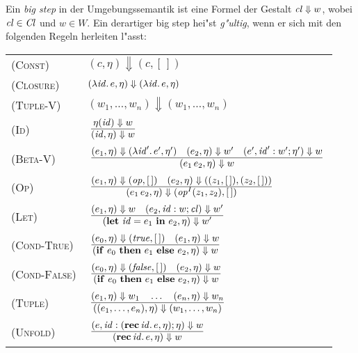 \documentclass[12pt,fleqn,a4paper]{article}
\newcommand{\RN}[1]{\mbox{\textsc{(#1)}}}
\newcommand{\Cl}{\name{Cl}}
\newcommand{\cl}{\name{cl}}
\begin{document}
\begin{definition}
Ein {\em big step} in der Umgebungssemantik ist eine Formel der Gestalt $\cl \Downarrow w$,
wobei $\cl\in\Cl$ und $w \in W$. Ein derartiger big step hei"st {\em g"ultig}, wenn er sich mit den
folgenden Regeln herleiten l"asst: \\[5mm]
\begin{tabular}{ll}
  \RN{Const}      & $(c,\eta) \Downarrow (c,[\,])$ \\[1mm]
  \RN{Closure}    & $(\lambda {\text{\it id\/}}.\,e,\eta) \Downarrow (\lambda {\text{\it id\/}}.\,e,\eta)$ \\[1mm]
  \RN{Tuple-V}    & $(w_1,\ldots,w_n) \Downarrow (w_1,\ldots,w_n)$ \\[1mm]
  \RN{Id}         & $\regel{\eta(\id) \Downarrow w}
                           {(\id,\eta) \Downarrow w}$ \\[3mm]
  \RN{Beta-V}     & $\regel{(e_1,\eta) \Downarrow (\abstr{\id'}{e'},\eta')
                            \quad (e_2,\eta) \Downarrow w'
                            \quad (e',\id':w';\eta') \Downarrow w}
                           {(\app{e_1}{e_2},\eta) \Downarrow w}$ \\[3mm]
  \RN{Op}         & $\regel{(e_1,\eta) \Downarrow (\op,[\,]) \quad (e_2,\eta) \Downarrow ((z_1,[\,]),(z_2,[\,]))}
                           {(\app{e_1}{e_2},\eta) \Downarrow (\op^I(z_1,z_2),[\,])}$ \\[3mm]
  \RN{Let}        & $\regel{(e_1,\eta) \Downarrow w \quad (e_2,\id:w;\cl) \Downarrow w'}
                           {(\bli{\id}{e_1}{e_2},\eta) \Downarrow w'}$ \\[3mm]
  \RN{Cond-True}  & $\regel{(e_0,\eta) \Downarrow (\true,[\,]) \quad (e_1,\eta) \Downarrow w}
                           {(\bifte{e_0}{e_1}{e_2},\eta) \Downarrow w}$ \\[3mm]
  \RN{Cond-False} & $\regel{(e_0,\eta) \Downarrow (\false,[\,]) \quad (e_2,\eta) \Downarrow w}
                           {(\bifte{e_0}{e_1}{e_2},\eta) \Downarrow w}$ \\[3mm]
  \RN{Tuple}      & $\regel{(e_1,\eta) \Downarrow w_1 \quad \ldots \quad (e_n,\eta) \Downarrow w_n}
                           {((e_1,\ldots,e_n),\eta) \Downarrow (w_1,\ldots,w_n)}$ \\[3mm]
  \RN{Unfold}     & $\regel{(e,\id:(\rec{\id}{e},\eta);\eta) \Downarrow w}
                           {(\rec{\id}{e},\eta) \Downarrow w}$ \\[3mm]
\end{tabular}
\end{definition}
\end{document}
